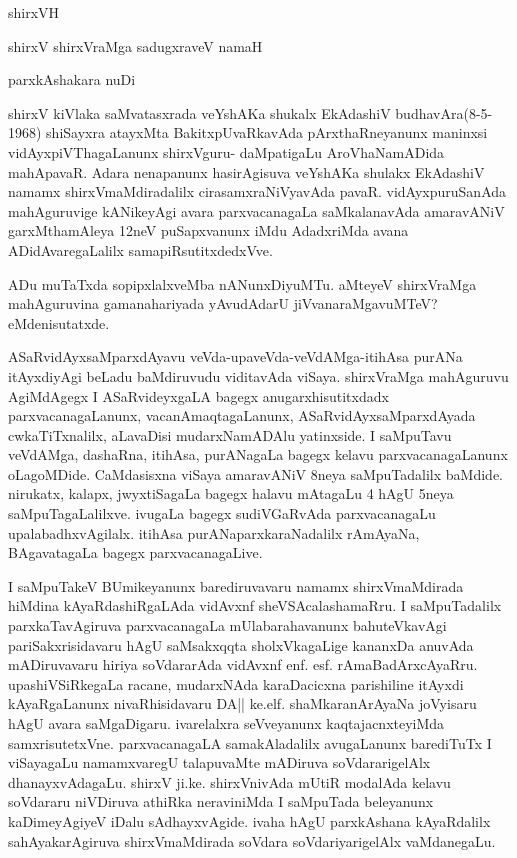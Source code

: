 \newpage

\begin{center}
shirxVH

\smallskip
shirxV shirxVraMga sadugxraveV namaH

\medskip

{\Large parxkAshakara nuDi}
\end{center}

shirxV kiVlaka saMvatasxrada veYshAKa shukalx EkAdashiV budhavAra(8-5-1968) shiSayxra atayxMta BakitxpUvaRkavAda pArxthaRneyanunx maninxsi vidAyxpiVThagaLanunx  shirxVguru- daMpatigaLu AroVhaNamADida mahApavaR. Adara nenapanunx hasirAgisuva veYshAKa shulakx EkAdashiV namamx shirxVmaMdiradalilx cirasamxraNiVyavAda pavaR. vidAyxpuruSanAda mahAguruvige kANikeyAgi avara parxvacanagaLa saMkalanavAda amaravANiV garxMthamAleya 12neV puSapxvanunx iMdu AdadxriMda avana ADidAvaregaLalilx samapiRsutitxdedxVve.

ADu muTaTxda sopipxlalxveMba nANunxDiyuMTu. aMteyeV shirxVraMga mahAguruvina gamanahariyada yAvudAdarU jiVvanaraMgavuMTeV? eMdenisutatxde.

ASaRvidAyxsaMparxdAyavu veVda-upaveVda-veVdAMga-itihAsa purANa itAyxdiyAgi beLadu baMdiruvudu viditavAda viSaya. shirxVraMga mahAguruvu AgiMdAgegx I ASaRvideyxgaLA bagegx anugarxhisutitxdadx parxvacanagaLanunx, vacanAmaqtagaLanunx, ASaRvidAyxsaMparxdAyada cwkaTiTxnalilx, aLavaDisi mudarxNamADAlu yatinxside. I saMpuTavu veVdAMga, dashaRna, itihAsa, purANagaLa bagegx kelavu parxvacanagaLanunx oLagoMDide. CaMdasisxna viSaya amaravANiV 8neya saMpuTadalilx baMdide. nirukatx, kalapx, jwyxtiSagaLa bagegx halavu mAtagaLu 4 hAgU 5neya saMpuTagaLalilxve. ivugaLa bagegx sudiVGaRvAda parxvacanagaLu upalabadhxvAgilalx. itihAsa purANaparxkaraNadalilx rAmAyaNa, BAgavatagaLa bagegx parxvacanagaLive.

I saMpuTakeV BUmikeyanunx barediruvavaru namamx shirxVmaMdirada hiMdina kAyaRdashiRgaLAda vidAvxnf sheVSAcalashamaRru. I saMpuTadalilx parxkaTavAgiruva parxvacanagaLa mUlabarahavanunx bahuteVkavAgi pariSakxrisidavaru hAgU saMsakxqqta sholxVkagaLige kananxDa anuvAda mADiruvavaru hiriya soVdararAda vidAvxnf enf. esf. rAmaBadArxcAyaRru. upashiVSiRkegaLa racane, mudarxNAda karaDacicxna parishiline itAyxdi kAyaRgaLanunx nivaRhisidavaru DA|| ke.elf. shaMkaranArAyaNa joVyisaru hAgU avara saMgaDigaru. ivarelalxra seVveyanunx kaqtajacnxteyiMda samxrisutetxVne.
parxvacanagaLA samakAladalilx avugaLanunx barediTuTx I viSayagaLu namamxvaregU talapuvaMte mADiruva soVdararigelAlx dhanayxvAdagaLu. shirxV ji.ke. shirxVnivAda mUtiR modalAda kelavu soVdararu niVDiruva athiRka neraviniMda I saMpuTada beleyanunx kaDimeyAgiyeV iDalu sAdhayxvAgide. ivaha hAgU parxkAshana kAyaRdalilx sahAyakarAgiruva shirxVmaMdirada soVdara soVdariyarigelAlx vaMdanegaLu.

